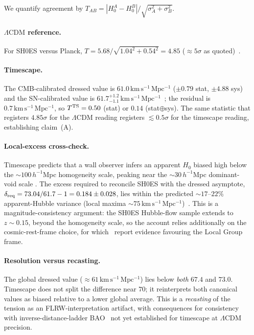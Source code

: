 \documentclass[aps,prd,twocolumn,nofootinbib,superscriptaddress,floatfix]{revtex4-2}
\newcommand{\Ho}{H_{0}}
\newcommand{\kmsmpc}{\,\mathrm{km\,s^{-1}\,Mpc^{-1}}}
\newcommand{\Lcdm}{\Lambda\mathrm{CDM}}
\begin{document}
We quantify agreement by $T_{AB}=|\Ho^A-\Ho^B|/\sqrt{\sigma_A^2+\sigma_B^2}$.

\paragraph*{$\Lcdm$ reference.} For SH0ES versus Planck,
$T=5.68/\sqrt{1.04^2+0.54^2}=4.85$ ($\approx5\sigma$ as quoted)~\cite{Riess2022}.

\paragraph*{Timescape.} The CMB-calibrated dressed value is $61.0\kmsmpc$
($\pm0.79$ stat, $\pm4.88$ sys)~\cite{Nazer2015} and the SN-calibrated value is
$61.7^{+1.2}_{-1.1}\kmsmpc$~\cite{Leith2008,Wiltshire2009}; the residual is
$0.7\kmsmpc$, so $T^{\rm TS}=0.50$ (stat) or $0.14$ (stat$\oplus$sys). The same
statistic that registers $4.85\sigma$ for the $\Lcdm$ reading registers
$\lesssim0.5\sigma$ for the timescape reading, establishing claim~(A).

\paragraph*{Local-excess cross-check.} Timescape predicts that a wall observer infers
an apparent $\Ho$ biased high below the $\sim\!100\,h^{-1}$Mpc homogeneity scale,
peaking near the $\sim\!30\,h^{-1}$Mpc dominant-void scale
\cite{Wiltshire2009,Smale2011}. The excess required to reconcile SH0ES with the
dressed asymptote, $\delta_{\rm req}=73.04/61.7-1=0.184\pm0.028$, lies within the
predicted $\sim\!17$--$22\%$ apparent-Hubble variance (local maxima
$\sim\!75\kmsmpc$)~\cite{Wiltshire2009}. This is a magnitude-consistency
argument: the SH0ES Hubble-flow sample extends to $z\sim0.15$, beyond the
homogeneity scale, so the account relies additionally on the cosmic-rest-frame
choice, for which~\cite{Wiltshire2013} report evidence favouring the Local Group
frame.

\paragraph*{Resolution versus recasting.} The global dressed value
($\approx\!61\kmsmpc$) lies below \emph{both} $67.4$ and $73.0$. Timescape does
not split the difference near $70$; it reinterprets both canonical values as
biased relative to a lower global average. This is a \emph{recasting} of the
tension as an FLRW-interpretation artifact, with consequences for consistency
with inverse-distance-ladder BAO~\cite{DESI2024} not yet established for
timescape at $\Lcdm$ precision.
\end{document}
